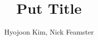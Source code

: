 \documentclass{sig-alternate-pretty-10pt}
\newcommand{\supsym}[1]{\raisebox{4pt}{{\footnotesize #1}}}
\newcommand{\gt}{\supsym{$\dag$}}
\newcommand{\wisc}{\supsym{$\ast$}}
\begin{document}
 

\title{Put Title\\}
\author{Hyojoon Kim\gt, Nick Feamster\gt\\
\gt~} 


\maketitle

\begin{sloppypar}



\begin{small}


\end{small}
\end{sloppypar}
\end{document}
